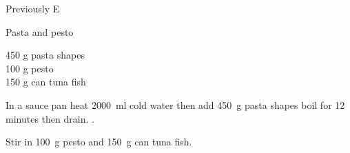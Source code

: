 \begin{menu}{Previously E}
    \begin{recipe}{1}{Pasta and pesto}%
    
		\begin{ingredients}
		450 g pasta shapes  \\
	100 g pesto  \\
	150 g can tuna fish  \\
	
		\end{ingredients}
	
    \begin{instructions}
    \item 
      In a sauce pan heat
      2000~ml  cold water then add
      450~g  pasta shapes
      boil for 12
      minutes then drain.
    .
      \item 
        Stir in
        100~g  pesto and
        150~g  can tuna fish.
      
    \end{instructions}
    \end{recipe}%
  
    \clearpage
    \end{menu}
	

